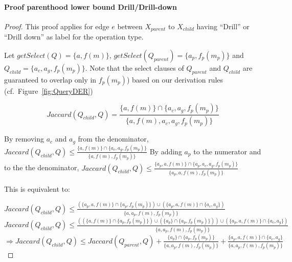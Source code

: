 \paragraph*{Proof parenthood lower bound Drill/Drill-down}
\begin{proof}
This proof applies for edge $e$ between $X_{parent}$ to $X_{child}$ having ``Drill'' or ``Drill down''  as label for the operation type. 

Let $getSelect(Q) = \{a, f(m)\}$, $getSelect(Q_{parent}) = \{ a_p, f_p(m_p)\}$ and $Q_{child} = \{a_c, a_g, f_p(m_p)\}$. Note that the select clauses of $Q_{parent}$ and $Q_{child}$ are guaranteed to overlap only in $f_p(m_p)$) based on our derivation rules %
(cf.~Figure~\ref{fig:QueryDER})

\[Jaccard(Q_{child},Q)=  \frac{  \{a, f(m)\} \cap  \{ a_c, a_g,f_p(m_p) \} } {\{ a, f(m), a_c,a_g, f_p(m_p) \}}\]

By removing $a_c$ and $a_g$ from the denominator, $ Jaccard(Q_{child},Q) \leq  \frac{  \{a, f(m)\} \cap  \{ a_c, a_g,f_p(m_p) \} } {\{ a, f(m),  f_p(m_p) \}}$
By adding $a_p$ to the numerator and to the the denominator,  $ Jaccard(Q_{child},Q) \leq  \frac{  \{a_p,a, f(m)\} \cap  \{ a_p,a_c, a_g,f_p(m_p) \} } {\{a_p, a, f(m),  f_p(m_p) \}}$



This is equivalent to: 


$Jaccard(Q_{child},Q)   \leq    \frac{\left( \{a_p, a,f(m) \} \cap \{ a_p, f_p(m_p) \}   \right) \cup \left(  \{a_p,a,f(m) \} \cap \{ a_c,a_g \}  \right)}{\{  a,a_p, f(m),  f_p(m_p)  \} }  $\\


$Jaccard(Q_{child},Q)   \leq    \frac{\left( \left( \{a,f(m) \} \cap \{ a_p, f_p(m_p) \} \right) \cup  \left( \{a_p \} \cap \{ a_p, f_p(m_p) \} \right) \right) \cup \left(  \{a_p,a,f(m) \} \cap \{ a_c,a_g \}  \right)}{\{  a,a_p, f(m),  f_p(m_p)  \} }  $\\


$\Rightarrow Jaccard(Q_{child},Q)   \leq   Jaccard(Q_{parent}, Q) +  \frac{ \{a_p \} \cap \{ a_p, f_p(m_p) \}}{\{  a,a_p, f(m),  f_p(m_p)  \} } + \frac{\{a_p,a,f(m) \} \cap \{ a_c,a_g \} }{\{  a,a_p, f(m),  f_p(m_p)  \} }  $\\


\end{proof}
